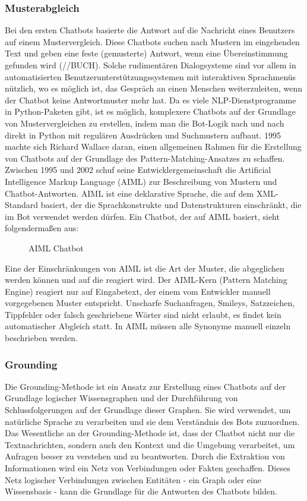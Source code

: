 \subsubsection{Musterabgleich}
Bei den ersten Chatbots basierte die Antwort auf die Nachricht eines Benutzers auf einem Mustervergleich. Diese Chatbots suchen nach Mustern im eingehenden Text und geben eine feste (gemusterte) Antwort, wenn eine Übereinstimmung gefunden wird (//BUCH).
Solche rudimentären Dialogsysteme sind vor allem in automatisierten Benutzerunterstützungssystemen mit interaktiven Sprachmenüs nützlich, wo es möglich ist, das Gespräch an einen Menschen weiterzuleiten, wenn der Chatbot keine Antwortmuster mehr hat.
Da es viele NLP-Dienstprogramme in Python-Paketen gibt, ist es möglich, komplexere Chatbots auf der Grundlage von Mustervergleichen zu erstellen, indem man die Bot-Logik nach und nach direkt in Python mit regulären Ausdrücken und Suchmustern aufbaut.
1995 machte sich Richard Wallace daran, einen allgemeinen Rahmen für die Erstellung von Chatbots auf der Grundlage des Pattern-Matching-Ansatzes zu schaffen. Zwischen 1995 und 2002 schuf seine Entwicklergemeinschaft die Artificial Intelligence Markup Language (AIML) zur Beschreibung von Mustern und Chatbot-Antworten.
AIML ist eine deklarative Sprache, die auf dem XML-Standard basiert, der die Sprachkonstrukte und Datenstrukturen einschränkt, die im Bot verwendet werden dürfen. Ein Chatbot, der auf AIML basiert, sieht folgendermaßen aus:
\begin{figure}[H]
    \centering
    \caption{\label{figure:Aiml_Bot}AIML Chatbot}
\end{figure}
\noindent
Eine der Einschränkungen von AIML ist die Art der Muster, die abgeglichen werden können und auf die reagiert wird. Der AIML-Kern (Pattern Matching Engine) reagiert nur auf Eingabetext, der einem vom Entwickler manuell vorgegebenen Muster entspricht. Unscharfe Suchanfragen, Smileys, Satzzeichen, Tippfehler oder falsch geschriebene Wörter sind nicht erlaubt, es findet kein automatischer Abgleich statt. In AIML müssen alle Synonyme manuell einzeln beschrieben werden.
\subsubsection{Grounding}
Die Grounding-Methode ist ein Ansatz zur Erstellung eines Chatbots auf der Grundlage logischer Wissensgraphen und der Durchführung von Schlussfolgerungen auf der Grundlage dieser Graphen. Sie wird verwendet, um natürliche Sprache zu verarbeiten und sie dem Verständnis des Bots zuzuordnen. Das Wesentliche an der Grounding-Methode ist, dass der Chatbot nicht nur die Textnachrichten, sondern auch den Kontext und die Umgebung verarbeitet, um Anfragen besser zu verstehen und zu beantworten. Durch die Extraktion von Informationen wird ein Netz von Verbindungen oder Fakten geschaffen. Dieses Netz logischer Verbindungen zwischen Entitäten - ein Graph oder eine Wissensbasis - kann die Grundlage für die Antworten des Chatbots bilden. 

